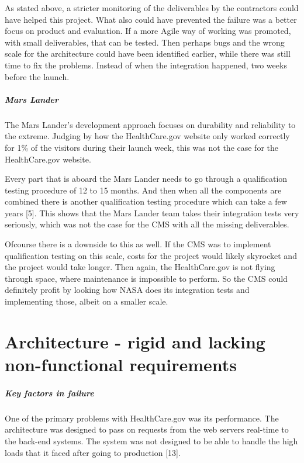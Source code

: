 \documentclass[]{article}
\let\oldsubparagraph\subparagraph
\renewcommand{\subparagraph}[1]{\oldsubparagraph{#1}\mbox{}}
\begin{document}
As stated above, a stricter monitoring of the deliverables by the
contractors could have helped this project. What also could have
prevented the failure was a better focus on product and evaluation. If a
more Agile way of working was promoted, with small deliverables, that
can be tested. Then perhaps bugs and the wrong scale for the
architecture could have been identified earlier, while there was still
time to fix the problems. Instead of when the integration happened, two
weeks before the launch.

\subparagraph{Mars Lander}\label{mars-lander}

The Mars Lander's development approach focuses on durability and
reliability to the extreme. Judging by how the HealthCare.gov website
only worked correctly for 1\% of the visitors during their launch week,
this was not the case for the HealthCare.gov website.

Every part that is aboard the Mars Lander needs to go through a
qualification testing procedure of 12 to 15 months. And then when all
the components are combined there is another qualification testing
procedure which can take a few years {[}5{]}. This shows that the Mars
Lander team takes their integration tests very seriously, which was not
the case for the CMS with all the missing deliverables.

Ofcourse there is a downside to this as well. If the CMS was to
implement qualification testing on this scale, costs for the project
would likely skyrocket and the project would take longer. Then again,
the HealthCare.gov is not flying through space, where maintenance is
impossible to perform. So the CMS could definitely profit by looking how
NASA does its integration tests and implementing those, albeit on a
smaller scale.

\section{Architecture - rigid and lacking non-functional
requirements}\label{architecture---rigid-and-lacking-non-functional-requirements}

\subparagraph{Key factors in failure}\label{key-factors-in-failure-1}

One of the primary problems with HealthCare.gov was its performance. The
architecture was designed to pass on requests from the web servers
real-time to the back-end systems. The system was not designed to be
able to handle the high loads that it faced after going to production
{[}13{]}.
\end{document}
